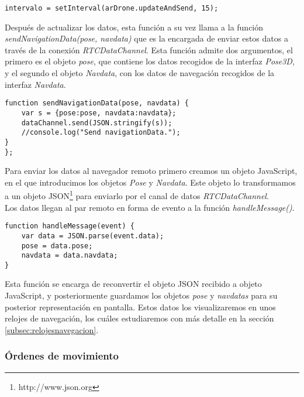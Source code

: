 \begin{lstlisting}[caption=Intervalo actualización y envío de datos de los sensores.]
intervalo = setInterval(arDrone.updateAndSend, 15);
\end{lstlisting}

Después de actualizar los datos, esta función a su vez llama a la función \emph{sendNavigationData(pose, navdata)} que es la encargada de enviar estos datos a través de la conexión \emph{RTCDataChannel}. Esta función admite dos argumentos, el primero es el objeto \emph{pose}, que contiene los datos recogidos de la interfaz \emph{Pose3D}, y el segundo el objeto \emph{Navdata}, con los datos de navegación recogidos de la interfaz \emph{Navdata}.\\

\begin{lstlisting}[caption=Envio de los datos de los sensores en el par local.]
function sendNavigationData(pose, navdata) {
	var s = {pose:pose, navdata:navdata};
	dataChannel.send(JSON.stringify(s));
	//console.log("Send navigationData.");
}
};\end{lstlisting}

Para enviar los datos al navegador remoto primero creamos un objeto JavaScript, en el que introducimos los objetos \emph{Pose} y \emph{Navdata}. Este objeto lo transformamos a un objeto JSON\footnote{http://www.json.org} para enviarlo por el canal de datos \emph{RTCDataChannel}.\\

Los datos llegan al par remoto en forma de evento a la función \emph{handleMessage()}.\\

\begin{lstlisting}[caption=Manejo de los datos de los sensores en el par remoto.]
function handleMessage(event) {
    var data = JSON.parse(event.data);
    pose = data.pose;
    navdata = data.navdata;
}
\end{lstlisting}

Esta función se encarga de reconvertir el objeto JSON recibido a objeto JavaScript, y posteriormente guardamos los objetos \emph{pose} y \emph{navdatas} para su posterior representación en pantalla. Estos datos los visualizaremos en unos relojes de navegación, los cuáles estudiaremos con más detalle en la sección \ref{subsec:relojesnavegacion}.\\


\subsubsection{Órdenes de movimiento}\label{subsec:ordenes}

